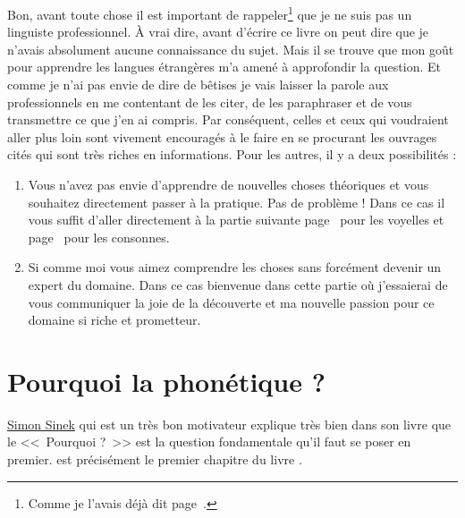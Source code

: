 Bon, avant toute chose il est important de rappeler\footnote{Comme je
  l'avais déjà dit page~\pageref{sec:phonetics}.} que je ne suis pas
un linguiste professionnel. À vrai dire, avant d'écrire ce livre on
peut dire que je n'avais absolument aucune connaissance du sujet. Mais
il se trouve que mon goût pour apprendre les langues étrangères m'a
amené à approfondir la question. Et comme je n'ai pas envie de dire de
bêtises je vais laisser la parole aux professionnels en me contentant
de les citer, de les paraphraser et de vous transmettre ce que j'en ai
compris. Par conséquent, celles et ceux qui voudraient aller plus loin
sont vivement encouragés à le faire en se procurant les ouvrages cités
qui sont très riches en informations. Pour les autres, il y a deux
possibilités :
\begin{enumerate}
\item Vous n'avez pas envie d'apprendre de nouvelles choses théoriques
  et vous souhaitez directement passer à la pratique. Pas de problème
  ! Dans ce cas il vous suffit d'aller directement à la partie
  suivante page~\pageref{part:vow} pour les voyelles et
  page~\pageref{part:conson} pour les consonnes.
\item Si comme moi vous aimez comprendre les choses sans forcément
  devenir un expert du domaine. Dans ce cas bienvenue dans cette
  partie où j'essaierai de vous communiquer la joie de la découverte
  et ma nouvelle passion pour ce domaine si riche et prometteur.  
\end{enumerate}

\chapter{Pourquoi la phonétique ?}\label{chap:phonetic}

\href{https://fr.wikipedia.org/wiki/Simon_Sinek}{Simon Sinek} qui est
un très bon motivateur explique très bien dans son livre
\href{https://amzn.to/2qY8uMD}{} que 
le <<~Pourquoi ?~>> est la question fondamentale qu'il faut se poser
en premier.  est précisément le premier chapitre
du livre \lodge.


\begin{center}
\begin{mdframed}[style=citestyle, frametitle={Extrait du livre \lodge}]
\end{mdframed}
\end{center}
  

